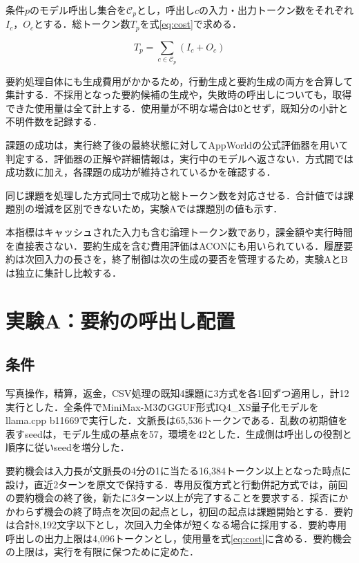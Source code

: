 \documentclass[letter]{ieicej}
\begin{document}
\par\noindent\begin{minipage}{\columnwidth}
\setlength{\abovedisplayskip}{4pt}\setlength{\belowdisplayskip}{4pt}
条件$p$のモデル呼出し集合を$\mathcal C_p$とし，呼出し$c$の入力・出力トークン数をそれぞれ$I_c$，$O_c$とする．総トークン数$T_p$を\mbox{式\eqref{eq:cost}で求める．}

\begin{equation}
 T_p=\sum_{c\in\mathcal C_p}(I_c+O_c)
 \label{eq:cost}
\end{equation}

要約処理自体にも生成費用がかかるため，行動生成と要約生成の両方を合算して集計する．不採用となった要約候補の生成や，失敗時の呼出しについても，取得できた使用量は全て計上する．使用量が不明な場合は0とせず，既知分の小計と不明件数を記録する．

\end{minipage}\par{}

課題の成功は，実行終了後の最終状態に対してAppWorldの公式評価器を用いて判定する\cite{trivedi2024appworld}．評価器の正解や詳細情報は，実行中のモデルへ返さない．方式間では成功数に加え，各課題の成功が維持されているかを確認する．

同じ課題を処理した方式同士で成功と総トークン数を対応させる．合計値では課題別の増減を区別できないため，実験Aでは課題別の値も示す．

本指標はキャッシュされた入力も含む論理トークン数であり，課金額や実行時間を直接表さない\cite{xu2026tokenpilot}．要約生成を含む費用評価はACONにも用いられている\cite{kang2026acon}．履歴要約は次回入力の長さを，終了制御は次の生成の要否を管理するため，実験AとBは独立に集計し比較する．

\section{実験A：要約の呼出し配置}

\subsection{条件}

写真操作，精算，返金，CSV処理の既知4課題に3方式を各1回ずつ適用し，計12実行とした．全条件でMiniMax-M3のGGUF形式IQ4\_XS量子化モデルをllama.cpp b11669で実行した．文脈長は65,536トークンである．乱数の初期値を表すseedは，モデル生成の基点を57，環境を42とした．生成側は呼出しの役割と順序に従いseedを増分した．

要約機会は入力長が文脈長の4分の1に当たる16,384トークン以上となった時点に設け，直近2ターンを原文で保持する．専用反復方式と行動併記方式では，前回の要約機会の終了後，新たに3ターン以上が完了することを要求する．採否にかかわらず機会の終了時点を次回の起点とし，初回の起点は課題開始とする．要約は合計8,192文字以下とし，次回入力全体が短くなる場合に採用する．要約専用呼出しの出力上限は4,096トークンとし，使用量を式\eqref{eq:cost}に含める．要約機会の上限は，実行を有限に保つために定めた．
\end{document}
